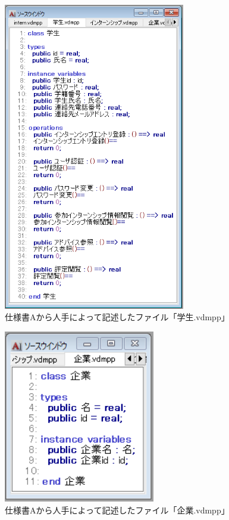 \begin{figure}[tp]
    \begin{center}
    \includegraphics[width=300]{image/speA_vdm3.PNG}
    \caption{仕様書Aから人手によって記述したファイル「学生.vdmpp」}
    \label{fig:speA_vdm3}
    \end{center}
\end{figure}

\begin{figure}[tp]
    \begin{center}
    \includegraphics[width=250]{image/speA_vdm4.PNG}
    \caption{仕様書Aから人手によって記述したファイル「企業.vdmpp」}
    \label{fig:speA_vdm4}
    \end{center}
\end{figure}

